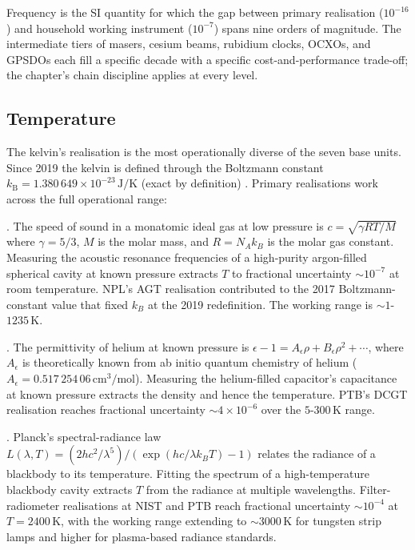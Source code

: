 Frequency is the SI quantity for which the gap between primary
realisation ($10^{-16}$) and household working instrument
($10^{-7}$) spans nine orders of magnitude. The intermediate tiers
of masers, cesium beams, rubidium clocks, OCXOs, and GPSDOs each
fill a specific decade with a specific cost-and-performance
trade-off; the chapter's chain discipline applies at every level.

\subsection{Temperature}

The kelvin's realisation is the most operationally diverse of the
seven base units. Since 2019 the kelvin is defined through the
Boltzmann constant $k_{\text{B}} = 1.380\,649 \times 10^{-23}
\,\si{\joule\per\kelvin}$ (exact by definition)
\cite{std:bipm-si2019}. Primary realisations work across the full
operational range:

. The speed of sound in a
monatomic ideal gas at low pressure is $c = \sqrt{\gamma R T/M}$
where $\gamma = 5/3$, $M$ is the molar mass, and $R = N_{A} k_{B}$
is the molar gas constant. Measuring the acoustic resonance
frequencies of a high-purity argon-filled spherical cavity at
known pressure extracts $T$ to fractional uncertainty
$\sim 10^{-7}$ at room temperature. NPL's AGT realisation
contributed to the 2017 Boltzmann-constant value that fixed
$k_{B}$ at the 2019 redefinition. The working range is
$\sim 1$-$1235\,\si{\kelvin}$.

. The
permittivity of helium at known pressure is $\epsilon - 1 =
A_{\epsilon} \rho + B_{\epsilon} \rho^{2} + \cdots$, where
$A_{\epsilon}$ is theoretically known from ab initio quantum
chemistry of helium ($A_{\epsilon} = 0.517\,254\,06\,\si{\centi
\meter\cubed\per\mol}$). Measuring the helium-filled capacitor's
capacitance at known pressure extracts the density and hence the
temperature. PTB's DCGT realisation reaches fractional
uncertainty $\sim 4 \times 10^{-6}$ over the $5$-$300\,\si{\kelvin}$
range.

. Planck's spectral-radiance law
$L(\lambda, T) = (2 h c^{2}/\lambda^{5})/(\exp(hc/\lambda k_{B} T)
- 1)$ relates the radiance of a blackbody to its temperature.
Fitting the spectrum of a high-temperature blackbody cavity
extracts $T$ from the radiance at multiple wavelengths.
Filter-radiometer realisations at NIST and PTB reach fractional
uncertainty $\sim 10^{-4}$ at $T = 2400\,\si{\kelvin}$, with the
working range extending to $\sim 3000\,\si{\kelvin}$ for tungsten
strip lamps and higher for plasma-based radiance standards.

